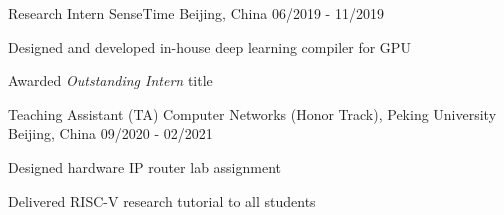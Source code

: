 
\begin{cventries}
    \cventry
    {Research Intern}
    {SenseTime}
    {Beijing, China}
    {06/2019 - 11/2019}
    {
        \begin{cvitems}
        \item {Designed and developed in-house deep learning compiler for GPU}
        \item {Awarded \textit{Outstanding Intern} title}
        \end{cvitems}
    }
\end{cventries}


\begin{cventries}
    \cventry
    {Teaching Assistant (TA)}
    {Computer Networks (Honor Track), Peking University}
    {Beijing, China}
    {09/2020 - 02/2021}
    {
        \begin{cvitems}
        \item {Designed hardware IP router lab assignment}
        \item {Delivered RISC-V research tutorial to all students}
        \end{cvitems}
    }
\end{cventries}
